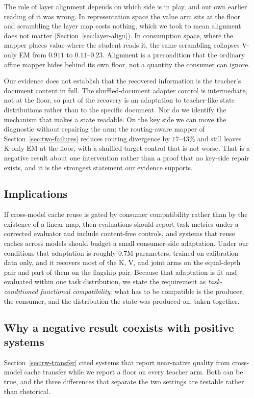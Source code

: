 \documentclass[11pt]{article}
\begin{document}
The role of layer alignment depends on which side is in play, and our own earlier
reading of it was wrong. In representation space the value arm sits at the floor
and scrambling the layer map costs nothing, which we took to mean alignment does
not matter (Section~\ref{sec:layer-align}). In consumption space, where the mapper places value
where the student reads it, the same scrambling collapses V-only EM from $0.911$
to $0.11$--$0.23$. Alignment is a precondition that the ordinary affine mapper
hides behind its own floor, not a quantity the consumer can ignore.

Our evidence does not establish that the recovered information is the teacher's
document content in full. The shuffled-document adapter control is intermediate,
not at the floor, so part of the recovery is an adaptation to teacher-like state
distributions rather than to the specific document. Nor do we identify the
mechanism that makes a state readable. On the key side we can move the diagnostic
without repairing the arm: the routing-aware mapper of
Section~\ref{sec:two-failures} reduces routing divergence by $17$--$43\%$ and
still leaves K-only EM at the floor, with a shuffled-target control that is not
worse. That is a negative result about one intervention rather than a proof that
no key-side repair exists, and it is the strongest statement our evidence
supports.

\subsection{Implications}
\label{sec:implications}
If cross-model cache reuse is gated by consumer compatibility rather than by the
existence of a linear map, then evaluations should report task metrics under a
corrected evaluator and include content-free controls, and systems that reuse
caches across models should budget a small consumer-side adaptation. Under our
conditions that adaptation is roughly $0.7$M parameters, trained on calibration
data only, and it recovers most of the K, V, and joint arms on the equal-depth
pair and part of them on the flagship pair. Because that adaptation is fit and
evaluated within one task distribution, we state the requirement as
\emph{task-conditioned functional compatibility}: what has to be compatible is
the producer, the consumer, and the distribution the state was produced on,
taken together.

\subsection{Why a negative result coexists with positive systems}
\label{sec:discussion-reconcile}
Section~\ref{sec:rw-transfer} cited systems that report near-native quality from
cross-model cache transfer while we report a floor on every teacher arm.
Both can be true, and the three differences that separate the two settings are
testable rather than rhetorical.
\end{document}
